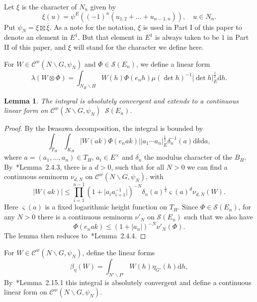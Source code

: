 \documentclass[letterpaper,11pt]{amsart}
\newcommand{\cC}{\mathcal{C}}
\newcommand{\cS}{\mathcal{S}}
\newcommand{\rd}{\mathrm{d}}
\newcommand{\bs}{\backslash}
\newcommand{\<}{\negthickspace}
\providecommand{\abs}[1]{\lvert#1\rvert}
\DeclareMathOperator{\otimeshat}{\widehat{\otimes}}
\theoremstyle{definition}
\theoremstyle{plain}
\newtheorem{lemma}[definition]{Lemma}
\theoremstyle{remark}
\numberwithin{equation}{section}
\begin{document}
Let $\xi$ is the character of $N_n$ given by
    \[
    \xi(u) = \psi^E((-1)^n (u_{1,2} + \hdots + u_{n-1, n})), \quad
    u \in N_n.
    \]
Put $\psi_{N} = \xi \boxtimes
\overline{\xi}$. As a note for the notation, $\xi$ is used in Part I of this paper to denote an element in $E^1$. But that element in $E^1$ is always taken to be $1$ in Part II of this paper, and $\xi$ will stand for the character we define here.

For $W \in \cC^w(N \bs G, \psi_{N})$ and $\Phi \in \cS(E_n)$, we define a
linear form
    \begin{equation}    \label{eq:local_RS}
    \lambda(W \otimes \Phi) = \int_{N_H \bs H}
    W(h) \Phi(e_n h) \mu(\det h)^{-1}
    \abs{\det h}_E^{\frac{1}{2}} \rd h.
    \end{equation}

\begin{lemma}
\label{lemma:lambda_continuous} The integral is absolutely convergent and
extends to a continuous linear form on $\cC^w(N \bs G, \psi_{N}) \otimeshat
\cS(E_n)$.
\end{lemma}

\begin{proof}
By the Iwasawa decomposition, the integral is bounded by
    \[
    \int_{T_H} \int_{K_H}
    \abs{W(ak) \Phi(e_n ak)}
    \abs{a_1\cdots a_n}_E^{\frac{1}{2}} \delta_n^{-1}(a) \rd k \rd a ,
    \]
where $a = (a_1, \hdots, a_n) \in T_H$, $a_i \in E^\times$ and $\delta_n$ the
modulus character of the $B_H$. By~\cite{BP1}*{Lemma~2.4.3}, there is a
$d>0$, such that for all $N>0$ we can find a continuous seminorm $\nu_{d, N}$
on $\cC^w(N \bs G, \psi_{N})$, with
    \[
    \abs{W(ak)} \leq \prod_{i=1}^{n-1} (1+\abs{a_ia_{i+1}^{-1}})^{-N}
    \delta_n(a)^{\frac{1}{2}} \varsigma(a)^d \nu_{d, N}(W).
    \]
Here $\varsigma(a)$ is a fixed logarithmic height function on $T_H$. Since
$\Phi \in \cS(E_n)$, for any $N>0$ there is a continuous seminorm $\nu'_N$ on
$\cS(E_n)$ such that we also have
    \[
    {\Phi(e_n a k)} \leq (1+\abs{a_n})^{-N} \nu'_N(\Phi).
    \]
The lemma then reduces to~\cite{BP1}*{Lemma~2.4.4}.
\end{proof}

For $W \in \cC^w(N \bs G, \psi_N)$, define the linear forms
    \begin{equation}    \label{eq:local_FR}
    \beta_{\eta}(W) = \int_{N' \bs P'} W(h) \eta_{G'}(h) \rd h,
    \end{equation}
By~\cite{BP1}*{Lemma~2.15.1} this integral is absolutely convergent and
define a continuous linear form on $\cC^w(N \bs G, \psi_{N})$.
\end{document}
